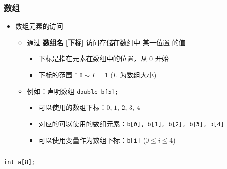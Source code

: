 \begin{frame}[fragile]
    \frametitle{数组}

    \begin{overlayarea}{\textwidth}{.55\textheight}
        \begin{itemize}
            \item 数组元素的访问

                \begin{itemize}
                    \item 通过 \textbf{数组名 [下标]} 访问存储在数组中 某一位置 的值
                        \begin{itemize}
                            \item 下标是指在元素在数组中的位置，从 $0$ 开始
                            \item 下标的范围：$0 \sim L - 1$ ($L$ 为数组大小)
                        \end{itemize}
                \end{itemize}

                \begin{itemize}
                    \item<2-> 例如：声明数组 \lstinline|double b[5];|
                        \begin{itemize}
                            \item 可以使用的数组下标：$0$, $1$, $2$, $3$, $4$
                            \item 对应的可以使用的数组元素：\lstinline|b[0], b[1], b[2], b[3], b[4]|
                            \item 可以使用变量作为数组下标：\lstinline|b[i]| ($0 \le i \le 4$)
                        \end{itemize}
                \end{itemize}
        \end{itemize}
    \end{overlayarea}

    \begin{columns}

        \lstinline|int a[8];|

    \end{columns}
\end{frame}
